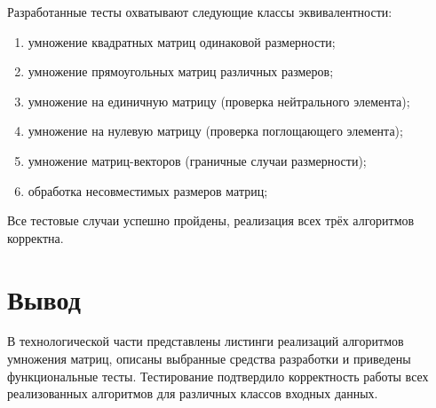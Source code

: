 Разработанные тесты охватывают следующие классы эквивалентности:
\begin{enumerate}
	\item умножение квадратных матриц одинаковой размерности;
	\item умножение прямоугольных матриц различных размеров;
	\item умножение на единичную матрицу (проверка нейтрального элемента);
	\item умножение на нулевую матрицу (проверка поглощающего элемента);
	\item умножение матриц-векторов (граничные случаи размерности);
	\item обработка несовместимых размеров матриц;
\end{enumerate}

Все тестовые случаи успешно пройдены, реализация всех трёх алгоритмов корректна.

\section{Вывод}

В технологической части представлены листинги реализаций алгоритмов умножения матриц, описаны выбранные средства разработки и приведены функциональные тесты. Тестирование подтвердило корректность работы всех реализованных алгоритмов для различных классов входных данных.

\clearpage